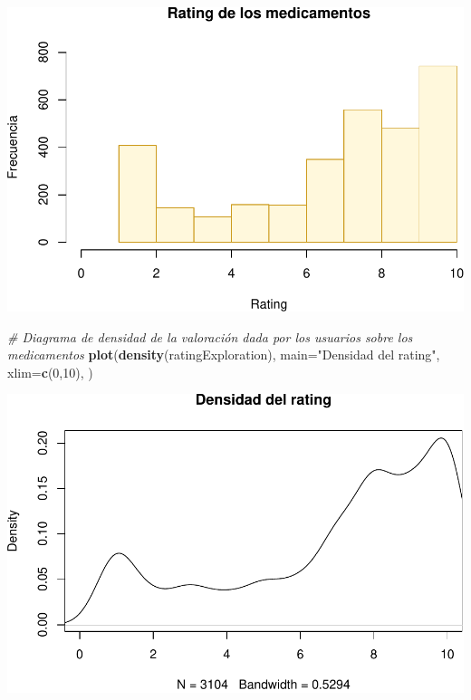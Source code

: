 \documentclass[spanish,]{article}
\newenvironment{Shaded}{\begin{snugshade}}{\end{snugshade}}
\newcommand{\KeywordTok}[1]{\textcolor[rgb]{0.13,0.29,0.53}{\textbf{#1}}}
\newcommand{\DataTypeTok}[1]{\textcolor[rgb]{0.13,0.29,0.53}{#1}}
\newcommand{\DecValTok}[1]{\textcolor[rgb]{0.00,0.00,0.81}{#1}}
\newcommand{\StringTok}[1]{\textcolor[rgb]{0.31,0.60,0.02}{#1}}
\newcommand{\CommentTok}[1]{\textcolor[rgb]{0.56,0.35,0.01}{\textit{#1}}}
\newcommand{\OperatorTok}[1]{\textcolor[rgb]{0.81,0.36,0.00}{\textbf{#1}}}
\newcommand{\NormalTok}[1]{#1}
\begin{document}
\includegraphics{practica-original_files/figure-latex/unnamed-chunk-84-1.pdf}

\begin{Shaded}
\begin{Highlighting}[]
\CommentTok{# Diagrama de densidad de la valoración dada por los usuarios sobre los medicamentos}
\KeywordTok{plot}\NormalTok{(}\KeywordTok{density}\NormalTok{(ratingExploration), }
     \DataTypeTok{main=}\StringTok{"Densidad del rating"}\NormalTok{,}
     \DataTypeTok{xlim=}\KeywordTok{c}\NormalTok{(}\DecValTok{0}\NormalTok{,}\DecValTok{10}\NormalTok{),}
\NormalTok{     )}
\end{Highlighting}
\end{Shaded}

\includegraphics{practica-original_files/figure-latex/unnamed-chunk-85-1.pdf}

\begin{Shaded}
\end{Shaded}
\end{document}
